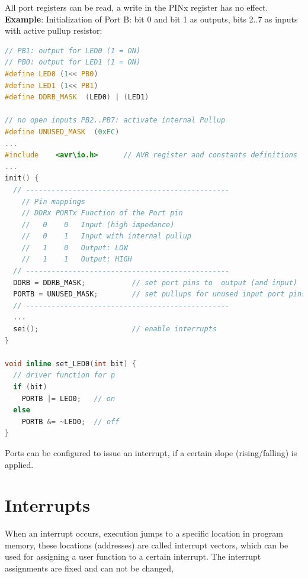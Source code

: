 All port registers can be read, a write in the PINx register has no effect.\\

\textbf{Example}:  Initialization of Port B: bit 0 and bit 1 as outputs, bits 2..7 as inputs with active  pullup resistor:\\

\begin{lstlisting}[style=mystyle, language=c]
// PB1: output for LED0 (1 = ON)
// PB0: output for LED1 (1 = ON)
#define LED0 (1<< PB0)
#define LED1 (1<< PB1)
#define DDRB_MASK  (LED0) | (LED1)

// no open inputs PB2..PB7: activate internal Pullup
#define UNUSED_MASK  (0xFC)
...
#include	<avr\io.h>		// AVR register and constants definitions
...
init() {
  // ------------------------------------------------
	// Pin mappings
	// DDRx PORTx Function of the Port pin
	//   0    0   Input (high impedance)
	//   0    1   Input with internal pullup
	//   1    0   Output: LOW
	//   1    1   Output: HIGH
  // ------------------------------------------------
  DDRB = DDRB_MASK;           // set port pins to  output (and input)
  PORTB = UNUSED_MASK;        // set pullups for unused input port pins 
  // ------------------------------------------------
  ...
  sei();                      // enable interrupts
}

void inline set_LED0(int bit) {
  // driver function for p
  if (bit)
	PORTB |= LED0;   // on
  else 
	PORTB &= ~LED0;  // off
}
\end{lstlisting}

Ports can be configured to issue an interrupt, if a certain slope (rising/falling) is applied.

\section{Interrupts}

When an interrupt occurs, execution jumps to a specific location in program memory, these locations (addresses) are called interrupt vectors, which can be used for assigning a user function to a certain interrupt. The interrupt assignments are fixed and can not be changed, 
\newpage

